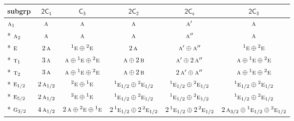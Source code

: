 \documentclass[10pt,a4paper]{article}
\numberwithin{equation}{section}
\newcommand{\grp}[1]{\mathsf{#1}}
\newcommand{\irr}[1]{\text{\normalfont\scshape #1}}
\newcommand{\conjpair}[1]{{}^{#1}}
\begin{document}
{\small\begin{longtable}{@{}lccccc@{}}\toprule
subgrp & \href{2C1.pdf}{$\grp{2C_{1}}$} & \href{C3.pdf}{$\grp{C_{3}}$} & \href{2C2.pdf}{$\grp{2C_{2}}$} & \href{2C1v.pdf}{$\grp{2C_{s}}$} & \href{2C3.pdf}{$\grp{2C_{3}}$}\\\midrule\endhead
\bottomrule\endfoot\endlastfoot
$\irr{a}_{1}$ & $\irr{a}$ & $\irr{a}$ & $\irr{a}$ & $\irr{a}'$ & $\irr{a}$\\*
$\irr{a}_{2}$ & $\irr{a}$ & $\irr{a}$ & $\irr{a}$ & $\irr{a}''$ & $\irr{a}$\\*
$\irr{e}$ & $2\,\irr{a}$ & $\conjpair{1}\irr{e}\oplus \conjpair{2}\irr{e}$ & $2\,\irr{a}$ & $\irr{a}'\oplus \irr{a}''$ & $\conjpair{1}\irr{e}\oplus \conjpair{2}\irr{e}$\\*
$\irr{t}_{1}$ & $3\,\irr{a}$ & $\irr{a}\oplus \conjpair{1}\irr{e}\oplus \conjpair{2}\irr{e}$ & $\irr{a}\oplus 2\,\irr{b}$ & $\irr{a}'\oplus 2\,\irr{a}''$ & $\irr{a}\oplus \conjpair{1}\irr{e}\oplus \conjpair{2}\irr{e}$\\*
$\irr{t}_{2}$ & $3\,\irr{a}$ & $\irr{a}\oplus \conjpair{1}\irr{e}\oplus \conjpair{2}\irr{e}$ & $\irr{a}\oplus 2\,\irr{b}$ & $2\,\irr{a}'\oplus \irr{a}''$ & $\irr{a}\oplus \conjpair{1}\irr{e}\oplus \conjpair{2}\irr{e}$\\*
$\irr{e}_{1/2}$ & $2\,\irr{a}_{1/2}$ & $\conjpair{2}\irr{e}\oplus \conjpair{1}\irr{e}$ & $\conjpair{1}\irr{e}_{1/2}\oplus \conjpair{2}\irr{e}_{1/2}$ & $\conjpair{1}\irr{e}_{1/2}\oplus \conjpair{2}\irr{e}_{1/2}$ & $\conjpair{1}\irr{e}_{1/2}\oplus \conjpair{2}\irr{e}_{1/2}$\\*
$\irr{e}_{5/2}$ & $2\,\irr{a}_{1/2}$ & $\conjpair{2}\irr{e}\oplus \conjpair{1}\irr{e}$ & $\conjpair{1}\irr{e}_{1/2}\oplus \conjpair{2}\irr{e}_{1/2}$ & $\conjpair{1}\irr{e}_{1/2}\oplus \conjpair{2}\irr{e}_{1/2}$ & $\conjpair{1}\irr{e}_{1/2}\oplus \conjpair{2}\irr{e}_{1/2}$\\*
$\irr{g}_{3/2}$ & $4\,\irr{a}_{1/2}$ & $2\,\irr{a}\oplus \conjpair{2}\irr{e}\oplus \conjpair{1}\irr{e}$ & $2\,\conjpair{1}\irr{e}_{1/2}\oplus 2\,\conjpair{2}\irr{e}_{1/2}$ & $2\,\conjpair{1}\irr{e}_{1/2}\oplus 2\,\conjpair{2}\irr{e}_{1/2}$ & $2\,\irr{a}_{3/2}\oplus \conjpair{1}\irr{e}_{1/2}\oplus \conjpair{2}\irr{e}_{1/2}$\\
\bottomrule\end{longtable}}
\end{document}
